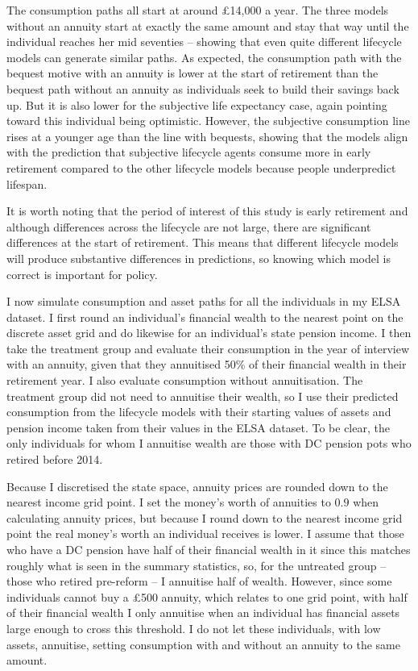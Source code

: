 \documentclass[12pt]{article}
\begin{document}
The consumption paths all start at around £14,000 a year. The three models without an
annuity start at exactly the same amount and stay that way until the individual
reaches her mid seventies -- showing that even quite different lifecycle models
can generate similar paths. As expected, the consumption path with the bequest
motive with an annuity is lower at the start of retirement than the bequest path
without an annuity as individuals seek to build their savings back up. But it is
also lower for the subjective life expectancy case, again pointing toward this
individual being optimistic. However, the subjective consumption line rises at a
younger age than the line with bequests, showing that the models align with the
prediction that subjective lifecycle agents consume more in early retirement
compared to the other lifecycle models because people underpredict lifespan.

It is worth noting that the period of interest of this study is early retirement
and although differences across the lifecycle are not large, there are
significant differences at the start of retirement. This means that different
lifecycle models will produce substantive differences in predictions, so knowing
which model is correct is important for policy.

I now simulate consumption and asset paths for all the individuals in my ELSA
dataset. I first round an individual's financial wealth to the nearest point on the
discrete asset grid and do likewise for an individual's state pension income. I
then take the treatment group and evaluate their consumption in the year of
interview with an annuity, given that they annuitised 50\% of their financial
wealth in their retirement year. I also evaluate consumption without
annuitisation. The treatment group did not need to annuitise their wealth, so I
use their predicted consumption from the lifecycle models with their starting
values of assets and pension income taken from their values in the ELSA dataset.
To be clear, the only individuals for whom I annuitise wealth are those with DC
pension pots who retired before 2014.

Because I discretised the state space, annuity prices are rounded down to the
nearest income grid point. I set the money's worth of annuities to $0.9$ when
calculating annuity prices, but because I round down to the nearest income grid
point the real money's worth an individual receives is lower. I assume that
those who have a DC pension have half of their financial wealth in it since this
matches roughly what is seen in the summary statistics, so, for the untreated
group -- those who retired pre-reform -- I annuitise half of wealth. However,
since some individuals cannot buy a £500 annuity, which relates to one grid
point, with half of their financial wealth I only annuitise when an individual
has financial assets large enough to cross this threshold. I do not let these
individuals, with low assets, annuitise, setting consumption with and without an
annuity to the same amount.
\end{document}
